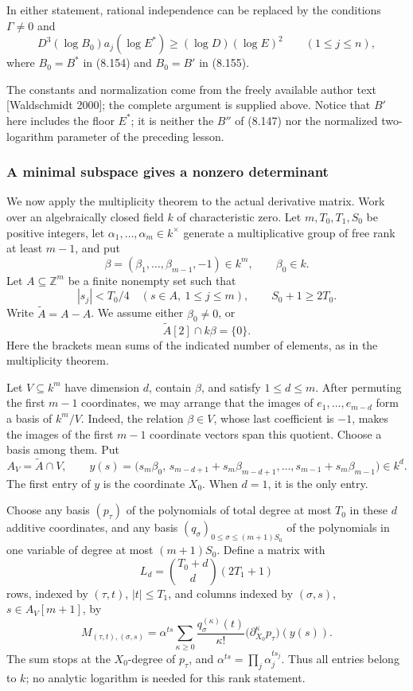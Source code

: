 \documentclass[
  11pt,
  a4paper,
]{article}
\begin{document}
In either statement, rational independence can be replaced by the
conditions \(\Gamma\ne0\) and \[
D^3(\log B_0)a_j(\log E^*)\ge
(\log D)(\log E)^2\qquad(1\le j\le n), \tag{8.156}
\] where \(B_0=B^*\) in (8.154) and \(B_0=B'\) in (8.155).

The constants and normalization come from the freely available author
text {[}Waldschmidt 2000{]}; the complete argument is supplied above.
Notice that \(B'\) here includes the floor \(E^*\); it is neither the
\(B''\) of (8.147) nor the normalized two-logarithm parameter of the
preceding lesson.

\subsubsection{A minimal subspace gives a nonzero
determinant}\label{a-minimal-subspace-gives-a-nonzero-determinant}

We now apply the multiplicity theorem to the actual derivative matrix.
Work over an algebraically closed field \(k\) of characteristic zero.
Let \(m,T_0,T_1,S_0\) be positive integers, let
\(\alpha_1,\ldots,\alpha_m\in k^\times\) generate a multiplicative group
of free rank at least \(m-1\), and put \[
\beta=(\beta_1,\ldots,\beta_{m-1},-1)\in k^m,
\qquad \beta_0\in k.
\] Let \(A\subseteq\mathbb Z^m\) be a finite nonempty set such that \[
|s_j|<T_0/4\quad(s\in A,\ 1\le j\le m),
\qquad S_0+1\ge2T_0.
\tag{8.157}
\] Write \(\widetilde A=A-A\). We assume either \(\beta_0\ne0\), or \[
\widetilde A[2]\cap k\beta=\{0\}.
\tag{8.158}
\] Here the brackets mean sums of the indicated number of elements, as
in the multiplicity theorem.

Let \(V\subseteq k^m\) have dimension \(d\), contain \(\beta\), and
satisfy \(1\le d\le m\). After permuting the first \(m-1\) coordinates,
we may arrange that the images of \(e_1,\ldots,e_{m-d}\) form a basis of
\(k^m/V\). Indeed, the relation \(\beta\in V\), whose last coefficient
is \(-1\), makes the images of the first \(m-1\) coordinate vectors span
this quotient. Choose a basis among them. Put \[
A_V=\widetilde A\cap V,\qquad
y(s)=
\bigl(s_m\beta_0,\,
s_{m-d+1}+s_m\beta_{m-d+1},\ldots,
s_{m-1}+s_m\beta_{m-1}\bigr)\in k^d.
\tag{8.159}
\] The first entry of \(y\) is the coordinate \(X_0\). When \(d=1\), it
is the only entry.

Choose any basis \((p_\tau)\) of the polynomials of total degree at most
\(T_0\) in these \(d\) additive coordinates, and any basis
\((q_\sigma)_{0\le\sigma\le(m+1)S_0}\) of the polynomials in one
variable of degree at most \((m+1)S_0\). Define a matrix with \[
L_d=\binom{T_0+d}{d}(2T_1+1)
\] rows, indexed by \((\tau,t)\), \(|t|\le T_1\), and columns indexed by
\((\sigma,s)\), \(s\in A_V[m+1]\), by \[
M_{(\tau,t),(\sigma,s)}
=\alpha^{ts}
\sum_{\kappa\ge0}
\frac{q_\sigma^{(\kappa)}(t)}{\kappa!}
\bigl(\partial_{X_0}^{\kappa}p_\tau\bigr)(y(s)).
\tag{8.160}
\] The sum stops at the \(X_0\)-degree of \(p_\tau\), and
\(\alpha^{ts}=\prod_j\alpha_j^{ts_j}\). Thus all entries belong to
\(k\); no analytic logarithm is needed for this rank statement.
\end{document}
